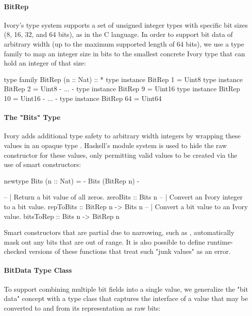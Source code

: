 \paragraph{BitRep}
Ivory's type system supports a set of unsigned integer types with
specific bit sizes (8, 16, 32, and 64 bits), as in the C language.
In order to support bit data of arbitrary width (up to the maximum
supported length of 64 bits), we use a type family
 to map an integer size in bits to the smallest
concrete Ivory type that can hold an integer of that size:

\begin{code}
type family BitRep (n :: Nat) :: *
type instance BitRep 1 = Uint8
type instance BitRep 2 = Uint8
{- ... -}
type instance BitRep 9 = Uint16
type instance BitRep 10 = Uint16
{- ... -}
type instance BitRep 64 = Uint64
\end{code}

\paragraph{The "Bits" Type}
Ivory adds additional type safety to arbitrary width integers by
wrapping these values in an opaque type .
Haskell's module system is used to hide the raw constructor for
these values, only permitting valid values to be created via the
use of smart constructors:

\begin{code}
newtype Bits (n :: Nat) = {- Bits (BitRep n) -}

-- | Return a bit value of all zeros.
zeroBits :: Bits n
-- | Convert an Ivory integer to a bit value.
repToBits :: BitRep n -> Bits n
-- | Convert a bit value to an Ivory value.
bitsToRep :: Bits n -> BitRep n
\end{code}

Smart constructors that are partial due to narrowing,
such as , automatically mask out any bits that are
out of range. It is also possible to define runtime-checked versions
of these functions that treat such "junk values" as an error.

\paragraph{BitData Type Class}
To support combining multiple bit fields into a single value, we
generalize the "bit data" concept with a type class 
that captures the interface of a value that may be converted to
and from its representation as raw bits:

